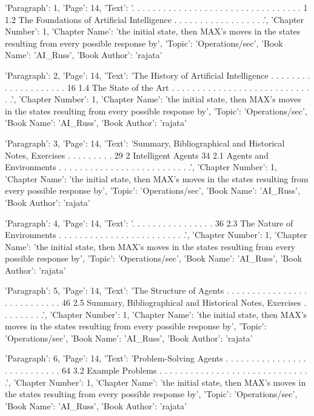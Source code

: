 {'Paragraph': 1, 'Page': 14, 'Text': '. . . . . . . . . . . . . . . . . . . . . . . . . . . . . . . . . 1 1.2 The Foundations of Artiﬁcial Intelligence . . . . . . . . . . . . . . . . . .', 'Chapter Number': 1, 'Chapter Name': 'the initial state, then MAX’s moves in the states resulting from every possible response by', 'Topic': 'Operations/sec', 'Book Name': 'AI_Russ', 'Book Author': 'rajata'}

{'Paragraph': 2, 'Page': 14, 'Text': 'The History of Artiﬁcial Intelligence . . . . . . . . . . . . . . . . . . . . 16 1.4 The State of the Art . . . . . . . . . . . . . . . . . . . . . . . . . . . . .', 'Chapter Number': 1, 'Chapter Name': 'the initial state, then MAX’s moves in the states resulting from every possible response by', 'Topic': 'Operations/sec', 'Book Name': 'AI_Russ', 'Book Author': 'rajata'}

{'Paragraph': 3, 'Page': 14, 'Text': 'Summary, Bibliographical and Historical Notes, Exercises . . . . . . . . . 29 2 Intelligent Agents 34 2.1 Agents and Environments . . . . . . . . . . . . . . . . . . . . . . . . . .', 'Chapter Number': 1, 'Chapter Name': 'the initial state, then MAX’s moves in the states resulting from every possible response by', 'Topic': 'Operations/sec', 'Book Name': 'AI_Russ', 'Book Author': 'rajata'}

{'Paragraph': 4, 'Page': 14, 'Text': '. . . . . . . . . . . . . . . . 36 2.3 The Nature of Environments . . . . . . . . . . . . . . . . . . . . . . . . .', 'Chapter Number': 1, 'Chapter Name': 'the initial state, then MAX’s moves in the states resulting from every possible response by', 'Topic': 'Operations/sec', 'Book Name': 'AI_Russ', 'Book Author': 'rajata'}

{'Paragraph': 5, 'Page': 14, 'Text': 'The Structure of Agents . . . . . . . . . . . . . . . . . . . . . . . . . . . 46 2.5 Summary, Bibliographical and Historical Notes, Exercises . . . . . . . . .', 'Chapter Number': 1, 'Chapter Name': 'the initial state, then MAX’s moves in the states resulting from every possible response by', 'Topic': 'Operations/sec', 'Book Name': 'AI_Russ', 'Book Author': 'rajata'}

{'Paragraph': 6, 'Page': 14, 'Text': 'Problem-Solving Agents . . . . . . . . . . . . . . . . . . . . . . . . . . . 64 3.2 Example Problems . . . . . . . . . . . . . . . . . . . . . . . . . . . . . .', 'Chapter Number': 1, 'Chapter Name': 'the initial state, then MAX’s moves in the states resulting from every possible response by', 'Topic': 'Operations/sec', 'Book Name': 'AI_Russ', 'Book Author': 'rajata'}

